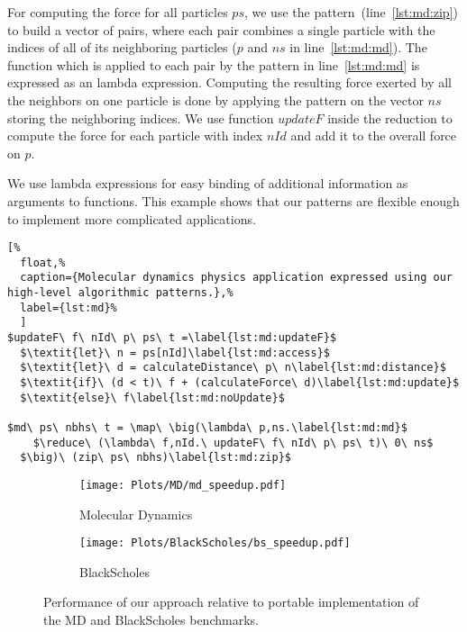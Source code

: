 For computing the force for all particles $ps$, we use the \zip pattern~(line~\ref{lst:md:zip}) to build a vector of pairs, where each pair combines a single particle with the indices of all of its neighboring particles ($p$ and $ns$ in line~\ref{lst:md:md}).
The function which is applied to each pair by the \map pattern in line~\ref{lst:md:md} is expressed as an lambda expression.
Computing the resulting force exerted by all the neighbors on one particle is done by applying the \reduce pattern on the vector $ns$ storing the neighboring indices.
We use function $updateF$ inside the reduction to compute the force for each particle with index $nId$ and add it to the overall force on $p$.

We use lambda expressions for easy binding of additional information as arguments to functions.
This example shows that our patterns are flexible enough to implement more complicated applications.


\begin{lstlisting}[%
  float,%
  caption={Molecular dynamics physics application expressed using our high-level algorithmic patterns.},%
  label={lst:md}%
  ]
$updateF\ f\ nId\ p\ ps\ t =\label{lst:md:updateF}$
  $\textit{let}\ n = ps[nId]\label{lst:md:access}$
  $\textit{let}\ d = calculateDistance\ p\ n\label{lst:md:distance}$
  $\textit{if}\ (d < t)\ f + (calculateForce\ d)\label{lst:md:update}$
  $\textit{else}\ f\label{lst:md:noUpdate}$

$md\ ps\ nbhs\ t = \map\ \big(\lambda\ p,ns.\label{lst:md:md}$
    $\reduce\ (\lambda\ f,nId.\ updateF\ f\ nId\ p\ ps\ t)\ 0\ ns$
  $\big)\ (zip\ ps\ nbhs)\label{lst:md:zip}$
\end{lstlisting}

\begin{figure}[t]
  \centering
  \begin{subfigure}[b]{0.48\linewidth}
    \texttt{[image: Plots/MD/md\_speedup.pdf]}
    \caption{Molecular Dynamics}
    \label{fig:md:results}
  \end{subfigure}
  \hfill
  \begin{subfigure}[b]{0.48\linewidth}
    \texttt{[image: Plots/BlackScholes/bs\_speedup.pdf]}
    \caption{BlackScholes}
    \label{fig:blackScholes:results}
  \end{subfigure}
  \caption{Performance of our approach relative to portable \OpenCL implementation of the MD and BlackScholes benchmarks.}
   \label{fig:bs:ms:results}
\end{figure}

